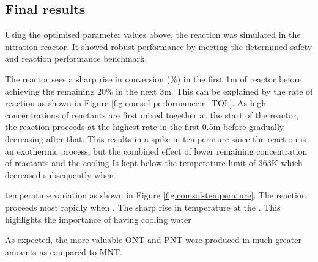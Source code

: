 \subsection{Final results}
Using the optimised parameter values above, the reaction was simulated in the nitration reactor. It showed robust performance by meeting the determined safety and reaction performance benchmark.

The reactor sees a sharp rise in conversion (\%) in the first 1m of reactor before achieving the remaining 20\% in the next \approx 3m. This can be explained by the rate of reaction as shown in Figure \ref{fig:comsol-performance:r_TOL}. As high concentrations of reactants are first mixed together at the start of the reactor, the reaction proceeds at the highest rate in the first 0.5m before gradually decreasing after that. This results in a spike in temperature since the reaction is an exothermic process, but the combined effect of lower remaining concentration of reactants and the cooling 
Is kept below the temperature limit of 363K which decreased subsequently when 

temperature variation as shown in Figure \ref{fig:comsol-temperature}. The reaction proceeds most rapidly when . 
The sharp rise in temperature at the . This highlights the importance of having cooling water 

As expected, the more valuable ONT and PNT were produced in much greater amounts as compared to MNT. 

